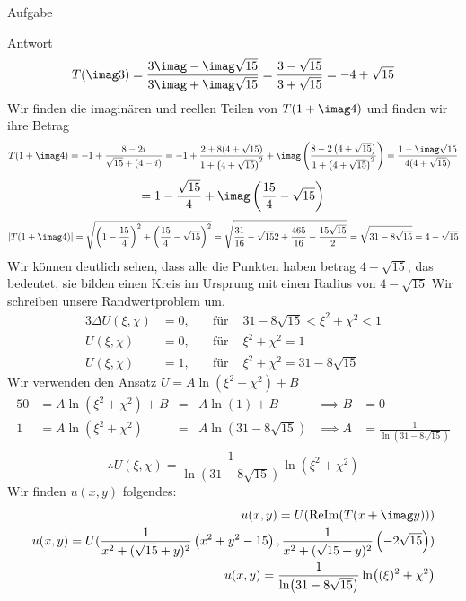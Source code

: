 \documentclass{scrartcl}
\begin{document}
\begin{section}{Aufgabe}
\begin{subsection}{Antwort}
\begin{align*}
        T(\imag 3)&=\frac{3 \imag-\imag \sqrt{15}}{3 \imag+\imag \sqrt{15}}=\frac{3-\sqrt{15}}{3 +\sqrt{15}}=-4+\sqrt{15}\\
    \end{align*}
    Wir finden die imaginären und reellen Teilen von $T(1+\imag 4)$ und finden wir ihre Betrag
    \[T(1+\imag 4)
    =-1+\frac{8-2 i}{\sqrt{15}+(4-i)}
    =-1+\frac{2+8(4+\sqrt{15})}{1+\left(4+\sqrt{15}\right)^2}+\imag\left(\frac{8-2\left(4+\sqrt{15}\right)}{1+\left(4+\sqrt{15}\right)^2}\right)
    =\frac{1-\imag\sqrt{15}}{4(4+\sqrt{15})}
    \]
    \[ =1-\frac{\sqrt{15}}{4}+\imag\left(\frac{15}{4}-\sqrt{15}    \right)\]
    \[\left|T(1+\imag 4)\right|=\sqrt{\left(1-\frac{15}{4}\right)^2+ \left(\frac{15}{4}-\sqrt{15} \right)^2}
    =\sqrt{\frac{31}{16}-\sqrt{15}{2}+\frac{465}{16}-\frac{15 \sqrt{15}}{2}}
    =\sqrt{31-8 \sqrt{15}}=4-\sqrt{15}\]
    Wir können deutlich sehen, dass alle die Punkten haben betrag $4-\sqrt{15}$, das bedeutet, sie bilden einen Kreis im Ursprung mit einen Radius von $4-\sqrt{15}$
    Wir schreiben unsere Randwertproblem um.
    \begin{alignat*}{3}
        \Delta U(\xi,\chi)&=0, \quad &\text{für }& 31-8 \sqrt{15}<\xi^2+\chi^2<1\\
        U(\xi,\chi)&=0, \quad &\text{für }& \xi^2+\chi^2=1\\
        U(\xi,\chi)&=1, \quad &\text{für }& \xi^2+\chi^2=31-8 \sqrt{15}
    \end{alignat*}
    Wir verwenden den Ansatz $U=A\ln(\xi^2+\chi^2)+B$
    \begin{alignat*}{5}
        0&=A\ln(\xi^2+\chi^2)+B&=&A\ln(1)+B&\implies B&=0\\
        1&=A\ln(\xi^2+\chi^2)&=&A\ln(31-8 \sqrt{15})& \implies A&=\frac{1}{\ln(31-8 \sqrt{15})}\\
    \end{alignat*}
    \[\therefore U(\xi,\chi)=\frac{1}{\ln(31-8 \sqrt{15})}\ln(\xi^2+\chi^2)\]
    Wir finden $u(x,y)$ folgendes: 
    \begin{align*}
        u(x,y)=U(\text{ReIm}(T(x+\imag y)))\\
        u(x,y)=U(\frac{1}{x^2+(\sqrt{15}+y)^2}\left(x^2+y^2-15\right),\frac{1}{x^2+(\sqrt{15}+y)^2}\left(-2\sqrt{15}\right))\\
        u(x,y)=\frac{1}{\ln(31-8 \sqrt{15})}\ln((\xi)^2+\chi^2)
    \end{align*}
\end{subsection}
\end{section}    
\end{document}
